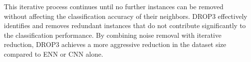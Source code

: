 This iterative process continues until no further instances can be removed without affecting the classification accuracy of their neighbors. DROP3 effectively identifies and removes redundant instances that do not contribute significantly to the classification performance. By combining noise removal with iterative reduction, DROP3 achieves a more aggressive reduction in the dataset size compared to ENN or CNN alone.


